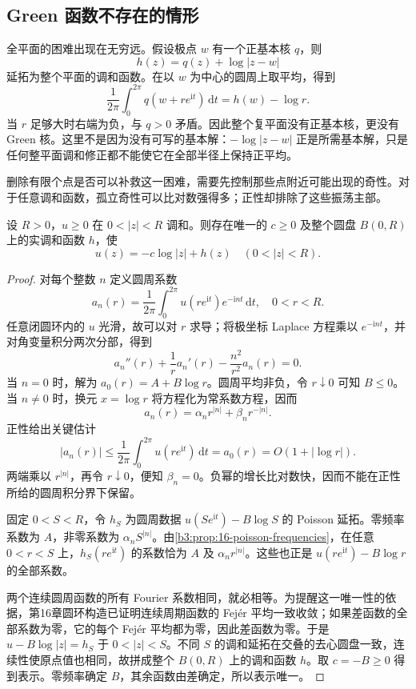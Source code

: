 \subsection{Green 函数不存在的情形}
\label{b3:subsec:170202}

全平面的困难出现在无穷远。假设极点 \(w\) 有一个正基本核 \(q\)，则
\[
 h(z)=q(z)+\log|z-w|
\]
延拓为整个平面的调和函数。在以 \(w\) 为中心的圆周上取平均，得到
\[
 \frac1{2\pi}\int_0^{2\pi}q(w+re^{\mathrm it})\,\mathrm dt
 =h(w)-\log r.
\]
当 \(r\) 足够大时右端为负，与 \(q>0\) 矛盾。因此整个复平面没有正基本核，更没有 Green 核。这里不是因为没有可写的基本解：\(-\log|z-w|\) 正是所需基本解，只是任何整平面调和修正都不能使它在全部半径上保持正平均。

\ProseParagraphBreak
删除有限个点是否可以补救这一困难，需要先控制那些点附近可能出现的奇性。对于任意调和函数，孤立奇性可以比对数强得多；正性却排除了这些振荡主部。

\begin{lemma}\label{b3:lem:17-positive-singularity}
设 \(R>0\)，\(u\ge0\) 在 \(0<|z|<R\) 调和。则存在唯一的 \(c\ge0\) 及整个圆盘 \(B(0,R)\) 上的实调和函数 \(h\)，使
\[
 u(z)=-c\log|z|+h(z)\quad(0<|z|<R).
\]
\end{lemma}
\begin{proof}
对每个整数 \(n\) 定义圆周系数
\[
 a_n(r)=\frac1{2\pi}\int_0^{2\pi}u(re^{\mathrm it})e^{-\mathrm int}\,\mathrm dt,
 \quad 0<r<R.
\]
任意闭圆环内的 \(u\) 光滑，故可以对 \(r\) 求导；将极坐标 Laplace 方程乘以 \(e^{-\mathrm int}\)，并对角变量积分两次分部，得到
\[
 a_n''(r)+\frac1r a_n'(r)-\frac{n^2}{r^2}a_n(r)=0.
\]
当 \(n=0\) 时，解为 \(a_0(r)=A+B\log r\)。圆周平均非负，令 \(r\downarrow0\) 可知 \(B\le0\)。当 \(n\ne0\) 时，换元 \(x=\log r\) 将方程化为常系数方程，因而
\[
 a_n(r)=\alpha_n r^{|n|}+\beta_n r^{-|n|}.
\]
正性给出关键估计
\[
 |a_n(r)|\le\frac1{2\pi}\int_0^{2\pi}u(re^{\mathrm it})\,\mathrm dt
 =a_0(r)=O(1+|\log r|).
\]
两端乘以 \(r^{|n|}\)，再令 \(r\downarrow0\)，便知 \(\beta_n=0\)。负幂的增长比对数快，因而不能在正性所给的圆周积分界下保留。

固定 \(0<S<R\)，令 \(h_S\) 为圆周数据 \(u(Se^{\mathrm it})-B\log S\) 的 Poisson 延拓。零频率系数为 \(A\)，非零系数为 \(\alpha_n S^{|n|}\)。由\cref{b3:prop:16-poisson-frequencies}，在任意 \(0<r<S\) 上，\(h_S(re^{\mathrm it})\) 的系数恰为 \(A\) 及 \(\alpha_n r^{|n|}\)。这些也正是 \(u(re^{\mathrm it})-B\log r\) 的全部系数。

两个连续圆周函数的所有 Fourier 系数相同，就必相等。为提醒这一唯一性的依据，第16章圆环构造已证明连续周期函数的 Fej\'er 平均一致收敛；如果差函数的全部系数为零，它的每个 Fej\'er 平均都为零，因此差函数为零。于是 \(u-B\log|z|=h_S\) 于 \(0<|z|<S\)。不同 \(S\) 的调和延拓在交叠的去心圆盘一致，连续性使原点值也相同，故拼成整个 \(B(0,R)\) 上的调和函数 \(h\)。取 \(c=-B\ge0\) 得到表示。零频率确定 \(B\)，其余函数由差确定，所以表示唯一。
\end{proof}

